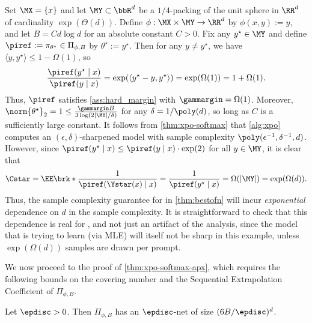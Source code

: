 \begin{example}\label{ex:softmax}
Set $\MX = \{x\}$ and let $\MY\subset\bbR^{d}$ be a $1/4$-packing of
the unit sphere in $\RR^d$ of cardinality $\exp(\Theta(d))$. Define
$\phi: \MX \times \MY \to \RR^d$ by $\phi(x,y) := y$, and let $B =
Cd\log d$ for an absolute constant $C>0$. Fix any $y^\star \in \MY$ and define $\piref := \pi_{\theta^\star} \in \Pi_{\phi,B}$ by $\theta^\star := y^\star$. Then for any $y \neq y^\star$, we have $\langle y, y^\star\rangle \leq 1 - \Omega(1)$, so 
\[\frac{\piref(y^\star\mid x)}{\piref(y\mid x)} = \exp(\langle y^\star - y, y^\star\rangle) = \exp(\Omega(1)) = 1+\Omega(1).\]
Thus, $\piref$ satisfies \cref{ass:hard_margin} with $\gammargin =
\Omega(1)$. Moreover, $\norm{\theta^\star}_2 = 1 \leq \frac{\gammargin
  B}{3\log(2|\MY|/\delta)}$ for any $\delta = 1/\poly(d)$, so long as
$C$ is a sufficiently large constant. It follows from
\cref{thm:xpo-softmax} that \cref{alg:xpo} computes an
$(\epsilon,\delta)$-sharpened model with sample complexity
$\poly(\epsilon^{-1},\delta^{-1},d)$. However, since
$\piref(y^\star\mid x) \leq \piref(y\mid x) \cdot \exp(2)$ for all $y
\in \MY$, it is clear that 
\[\Cstar = \EE\brk*{\frac{1}{\piref(\Ystar(x)\mid x)}} = \frac{1}{\piref(y^\star\mid x)} = \Omega(|\MY|) = \exp(\Omega(d)).\]
Thus, the sample complexity guarantee for \bestofnalg in
\cref{thm:bestofn} will incur \emph{exponential} dependence on $d$ in
the sample complexity. It is straightforward to check that this
dependence is real for \bestofnalg, and not just an artifact of the analysis, since the model that \bestofnalg is trying to learn (via MLE) will itself not be sharp in this example, unless $\exp(\Omega(d))$ samples are drawn per prompt.
\end{example}

We now proceed to the proof of \cref{thm:xpo-softmax-apx}, which requires the following bounds on the covering number and the Sequential Extrapolation Coefficient of $\Pi_{\phi,B}$.

\begin{lemma}\label{lemma:softmax-net}
Let $\epdisc>0$. Then $\Pi_{\phi,B}$ has an $\epdisc$-net of size $(6B/\epdisc)^d$.
\end{lemma}

